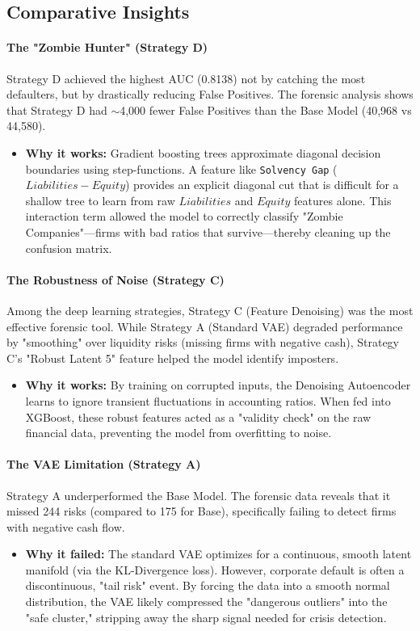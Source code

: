 \documentclass{report}\usepackage[]{graphicx}\usepackage[]{xcolor}
\begin{document}
\subsection{Comparative Insights}

\paragraph{The "Zombie Hunter" (Strategy D)}
Strategy D achieved the highest AUC (0.8138) not by catching the most defaulters, but by drastically reducing False Positives. The forensic analysis shows that Strategy D had $\sim$4,000 fewer False Positives than the Base Model (40,968 vs 44,580).
\begin{itemize}
    \item \textbf{Why it works:} Gradient boosting trees approximate diagonal decision boundaries using step-functions. A feature like \texttt{Solvency Gap} ($Liabilities - Equity$) provides an explicit diagonal cut that is difficult for a shallow tree to learn from raw $Liabilities$ and $Equity$ features alone. This interaction term allowed the model to correctly classify "Zombie Companies"—firms with bad ratios that survive—thereby cleaning up the confusion matrix.
\end{itemize}

\paragraph{The Robustness of Noise (Strategy C)}
Among the deep learning strategies, Strategy C (Feature Denoising) was the most effective forensic tool. While Strategy A (Standard VAE) degraded performance by "smoothing" over liquidity risks (missing firms with negative cash), Strategy C's "Robust Latent 5" feature helped the model identify imposters.
\begin{itemize}
    \item \textbf{Why it works:} By training on corrupted inputs, the Denoising Autoencoder learns to ignore transient fluctuations in accounting ratios. When fed into XGBoost, these robust features acted as a "validity check" on the raw financial data, preventing the model from overfitting to noise.
\end{itemize}

\paragraph{The VAE Limitation (Strategy A)}
Strategy A underperformed the Base Model. The forensic data reveals that it missed 244 risks (compared to 175 for Base), specifically failing to detect firms with negative cash flow.
\begin{itemize}
    \item \textbf{Why it failed:} The standard VAE optimizes for a continuous, smooth latent manifold (via the KL-Divergence loss). However, corporate default is often a discontinuous, "tail risk" event. By forcing the data into a smooth normal distribution, the VAE likely compressed the "dangerous outliers" into the "safe cluster," stripping away the sharp signal needed for crisis detection.
\end{itemize}
\end{document}
